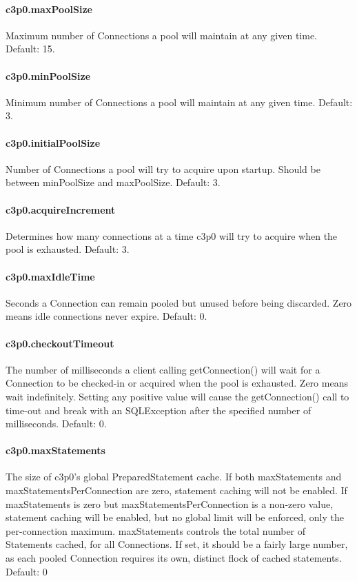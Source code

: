 \paragraph{c3p0.maxPoolSize}
Maximum number of Connections a pool will maintain at any given time.
Default: 15.

\paragraph{c3p0.minPoolSize}
Minimum number of Connections a pool will maintain at any given time.
Default: 3.

\paragraph{c3p0.initialPoolSize}
Number of Connections a pool will try to acquire upon startup. Should be between
minPoolSize and maxPoolSize.
Default: 3.

\paragraph{c3p0.acquireIncrement}
Determines how many connections at a time c3p0 will try to acquire when the pool
is exhausted.
Default: 3.

\paragraph{c3p0.maxIdleTime}
Seconds a Connection can remain pooled but unused before being discarded. Zero
means idle connections never expire.
Default: 0.

\paragraph{c3p0.checkoutTimeout}
The number of milliseconds a client calling getConnection() will wait for a Connection
to be checked-in or acquired when the pool is exhausted. Zero means wait indefinitely.
Setting any positive value will cause the getConnection() call to time-out and
break with an SQLException after the specified number of milliseconds.
Default: 0.

\paragraph{c3p0.maxStatements}
The size of c3p0's global PreparedStatement cache. If both max\-Statements and
maxStatementsPerConnection are zero, statement caching will not be enabled.
If maxStatements is zero but maxStatementsPerConnection is a non-zero value,
statement caching will be enabled, but no global limit will be enforced, only
the per-connection maximum. maxStatements controls the total number of Statements
cached, for all Connections. If set, it should be a fairly large number, as each
pooled Connection requires its own, distinct flock of cached statements.
Default: 0

